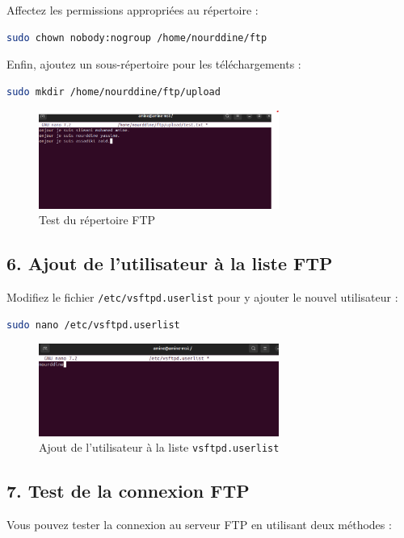 Affectez les permissions appropri\'ees au r\'epertoire :

\begin{lstlisting}[language=bash]
sudo chown nobody:nogroup /home/nourddine/ftp
\end{lstlisting}

Enfin, ajoutez un sous-r\'epertoire pour les t\'el\'echargements :

\begin{lstlisting}[language=bash]
sudo mkdir /home/nourddine/ftp/upload
\end{lstlisting}

\begin{figure}[h]
	\centering
	\includegraphics[width=0.7\textwidth]{FTP/fichier.png}
	\caption{Test du r\'epertoire FTP}
	\label{fig:ftp-test}
\end{figure}

\subsection*{6. Ajout de l'utilisateur \`a la liste FTP}
Modifiez le fichier \texttt{/etc/vsftpd.userlist} pour y ajouter le nouvel utilisateur :

\begin{lstlisting}[language=bash]
sudo nano /etc/vsftpd.userlist
\end{lstlisting}

\begin{figure}[h]
	\centering
	\includegraphics[width=0.7\textwidth]{FTP/user_list.png}
	\caption{Ajout de l'utilisateur \`a la liste \texttt{vsftpd.userlist}}
	\label{fig:userlist}
\end{figure}

\subsection*{7. Test de la connexion FTP}
Vous pouvez tester la connexion au serveur FTP en utilisant deux m\'ethodes :


